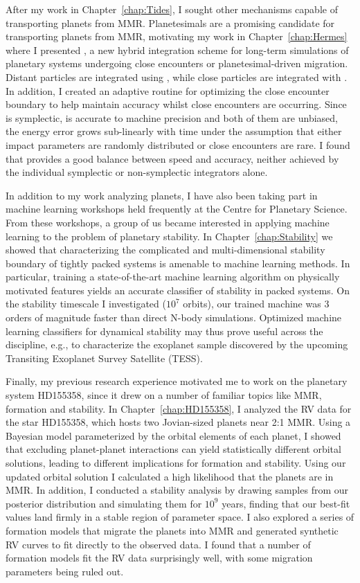 After my work in Chapter~\ref{chap:Tides}, I sought other mechanisms capable of transporting planets from MMR. 
Planetesimals are a promising candidate for transporting planets from MMR, motivating my work in Chapter~\ref{chap:Hermes} where I presented \hermes, a new hybrid integration scheme for long-term simulations of planetary systems undergoing close encounters or planetesimal-driven migration. 
Distant particles are integrated using \whfast, while close particles are integrated with \ias.
In addition, I created an adaptive routine for optimizing the close encounter boundary to help maintain accuracy whilst close encounters are occurring.
Since \whfast is symplectic, \ias is accurate to machine precision and both of them are unbiased, the energy error grows sub-linearly with time under the assumption that either impact parameters are randomly distributed or close encounters are rare.
I found that \hermes provides a good balance between speed and accuracy, neither achieved by the individual symplectic or non-symplectic integrators alone.

In addition to my work analyzing \kep planets, I have also been taking part in machine learning workshops held frequently at the Centre for Planetary Science. 
From these workshops, a group of us became interested in applying machine learning to the problem of planetary stability. 
In Chapter~\ref{chap:Stability} we showed that characterizing the complicated and multi-dimensional stability boundary of tightly packed systems is amenable to machine learning methods. 
In particular, training a state-of-the-art machine learning algorithm on physically motivated features yields an accurate classifier of stability in packed systems. 
On the stability timescale I investigated ($10^7$ orbits), our trained machine was 3 orders of magnitude faster than direct N-body simulations. 
Optimized machine learning classifiers for dynamical stability may thus prove useful across the discipline, e.g., to characterize the exoplanet sample discovered by the upcoming Transiting Exoplanet Survey Satellite (TESS).

Finally, my previous research experience motivated me to work on the planetary system HD155358, since it drew on a number of familiar topics like MMR, formation and stability. 
In Chapter~\ref{chap:HD155358}, I analyzed the RV data for the star HD155358, which hosts two Jovian-sized planets near 2:1 MMR. 
Using a Bayesian model parameterized by the orbital elements of each planet, I showed that excluding planet-planet interactions can yield statistically different orbital solutions, leading to different implications for formation and stability. 
Using our updated orbital solution I calculated a high likelihood that the planets are in MMR. 
In addition, I conducted a stability analysis by drawing samples from our posterior distribution and simulating them for $10^9$ years, finding that our best-fit values land firmly in a stable region of parameter space.
I also explored a series of formation models that migrate the planets into MMR and generated synthetic RV curves to fit directly to the observed data. 
I found that a number of formation models fit the RV data surprisingly well, with some migration parameters being ruled out.

